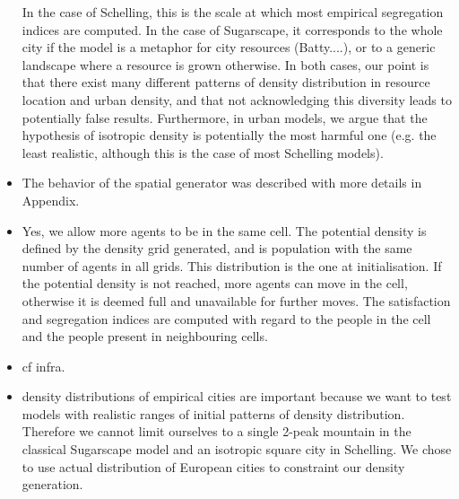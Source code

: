 \documentclass[11pt,a4paper,sans]{moderncv}        %
\begin{document}
\begin{itemize}
	In the case of Schelling, this is the scale at which most empirical segregation indices are computed. In the case of Sugarscape, it corresponds to the whole city if the model is a metaphor for city resources (Batty....), or to a generic landscape where a resource is grown otherwise. In both cases, our point is that there exist many different patterns of density distribution in resource location and urban density, and that not acknowledging this diversity leads to potentially false results. Furthermore, in urban models, we argue that the hypothesis of isotropic density is potentially the most harmful one (e.g. the least realistic, although this is the case of most Schelling models).
	
	
	\item The behavior of the spatial generator was described with more details in Appendix.
	
	\item Yes, we allow more agents to be in the same cell. The potential density is defined by the density grid generated, and is population with the same number of agents in all grids. This distribution is the one at initialisation. If the potential density is not reached, more agents can move in the cell, otherwise it is deemed full and unavailable for further moves. The satisfaction and segregation indices are computed with regard to the people in the cell and the people present in neighbouring cells.
	
	\item cf infra. 
	\item density distributions of empirical cities are important because we want to test models with realistic ranges of initial patterns of density distribution. Therefore we cannot limit ourselves to a single 2-peak mountain in the classical Sugarscape model and an isotropic square city in Schelling. We chose to use actual distribution of European cities to constraint our density generation.
	

\end{itemize}
\end{document}
